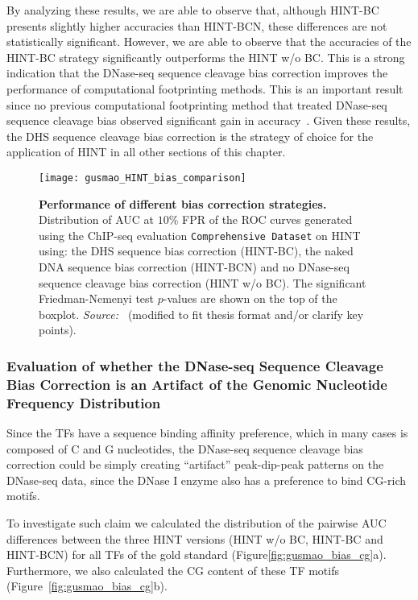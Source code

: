 By analyzing these results, we are able to observe that, although HINT-BC presents slightly higher accuracies than HINT-BCN, these differences are not statistically significant. However, we are able to observe that the accuracies of the HINT-BC strategy significantly outperforms the HINT w/o BC. This is a strong indication that the DNase-seq sequence cleavage bias correction improves the performance of computational footprinting methods. This is an important result since no previous computational footprinting method that treated DNase-seq sequence cleavage bias observed significant gain in accuracy~\citep{yardimci2014,sung2014,kahara2015}. Given these results, the DHS sequence cleavage bias correction is the strategy of choice for the application of HINT in all other sections of this chapter.

\begin{figure}[h!]
\centering
\texttt{[image: gusmao\_HINT\_bias\_comparison]}
\caption[Performance of different bias correction strategies]{\textbf{Performance of different bias correction strategies.} Distribution of AUC at $10\%$ FPR of the ROC curves generated using the ChIP-seq evaluation {\tt Comprehensive Dataset} on HINT using: the DHS sequence bias correction (HINT-BC), the naked DNA sequence bias correction (HINT-BCN) and no DNase-seq sequence cleavage bias correction (HINT w/o BC). The significant Friedman-Nemenyi test $p$-values are shown on the top of the boxplot. \emph{Source:~\cite{gusmao2016}} (modified to fit thesis format and/or clarify key points).}
\label{fig:gusmao_HINT_bias_comparison}
\end{figure}

\subsubsection{Evaluation of whether the DNase-seq Sequence Cleavage Bias Correction is an Artifact of the Genomic Nucleotide Frequency Distribution}

Since the TFs have a sequence binding affinity preference, which in many cases is composed of C and G nucleotides, the DNase-seq sequence cleavage bias correction could be simply creating ``artifact'' peak-dip-peak patterns on the DNase-seq data, since the DNase I enzyme also has a preference to bind CG-rich motifs.

To investigate such claim we calculated the distribution of the pairwise AUC differences between the three HINT versions (HINT w/o BC, HINT-BC and HINT-BCN) for all TFs of the  gold standard (Figure\ref{fig:gusmao_bias_cg}a). Furthermore, we also calculated the CG content of these TF motifs (Figure~\ref{fig:gusmao_bias_cg}b). 

